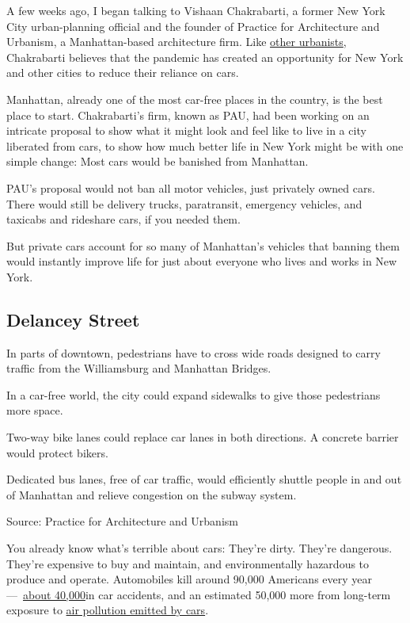 A few weeks ago, I began talking to Vishaan Chakrabarti, a former New
York City urban-planning official and the founder of Practice for
Architecture and Urbanism, a Manhattan-based architecture firm. Like
\href{https://www.nytimes3xbfgragh.onion/2020/06/20/opinion/pandemic-automobile-cities.html?action=click\&module=Opinion\&pgtype=Homepage}{other
urbanists}, Chakrabarti believes that the pandemic has created an
opportunity for New York and other cities to reduce their reliance on
cars.

Manhattan, already one of the most car-free places in the country, is
the best place to start. Chakrabarti's firm, known as PAU, had been
working on an intricate proposal to show what it might look and feel
like to live in a city liberated from cars, to show how much better life
in New York might be with one simple change: Most cars would be banished
from Manhattan.

PAU's proposal would not ban all motor vehicles, just privately owned
cars. There would still be delivery trucks, paratransit, emergency
vehicles, and taxicabs and rideshare cars, if you needed them.

But private cars account for so many of Manhattan's vehicles that
banning them would instantly improve life for just about everyone who
lives and works in New York.

\hypertarget{delancey-street}{%
\subsection{Delancey Street}\label{delancey-street}}

In parts of downtown, pedestrians have to cross wide roads designed to
carry traffic from the Williamsburg and Manhattan Bridges.

In a car-free world, the city could expand sidewalks to give those
pedestrians more space.

Two-way bike lanes could replace car lanes in both directions. A
concrete barrier would protect bikers.

Dedicated bus lanes, free of car traffic, would efficiently shuttle
people in and out of Manhattan and relieve congestion on the subway
system.

Source: Practice for Architecture and Urbanism

You already know what's terrible about cars: They're dirty. They're
dangerous. They're expensive to buy and maintain, and environmentally
hazardous to produce and operate. Automobiles kill around 90,000
Americans every year
---~\href{https://ohsonline.com/articles/2019/02/18/nsc-motor-vehicle-deaths.aspx\#:~:text=National\%20Safety\%20Council.-,NSC\%20estimates\%20that\%20in\%202018\%2C\%2040\%2C000\%20people\%20died\%20in\%20car,percent\%20decrease\%20from\%202017\%20figures.}{about
40,000}in car accidents, and an estimated 50,000 more from long-term
exposure to
\href{https://www.sciencedirect.com/science/article/abs/pii/S1352231013004548}{air
pollution emitted by cars}.

